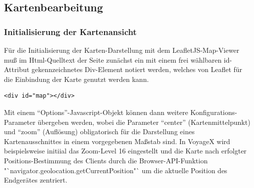 

\subsection{Kartenbearbeitung}\label{5_KARBE}

\subsubsection{Initialisierung der Kartenansicht}\label{5_DARS_KART}
Für die Initialisierung der Karten-Darstellung mit dem LeafletJS-Map-Viewer muß im Html-Quelltext der Seite zunächst ein mit einem frei wählbaren id-Attribut gekennzeichnetes Div-Element notiert werden, welches von Leaflet für die Einbindung der Karte genutzt werden kann.
\lstset{language=Html5}
\begin{lstlisting}[frame=single,numbers=none,xleftmargin=0pt]
<div id="map"></div>
\end{lstlisting}
Mit einem "`Options"'-Javascript-Objekt können dann weitere Konfigurations-Parameter übergeben werden, wobei die Parameter "`center"' (Kartenmittelpunkt) und "`zoom"' (Auflösung) obligatorisch für die Darstellung eines Kartenausschnittes in einem vorgegebenen Maßstab sind. In VoyageX wird beispielsweise
initiial das Zoom-Level 16 eingestellt und die Karte nach erfolgter Positions-Bestimmung des Clients durch die Browser-API-Funktion "`navigator.geolocation.getCurrentPosition"` um die aktuelle Position des Endgerätes zentriert.\\

